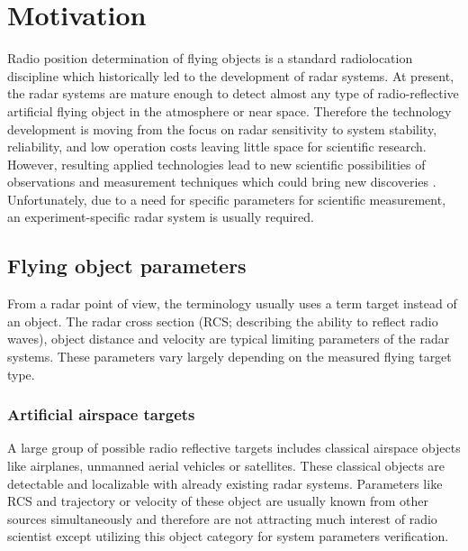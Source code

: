 \documentclass[twoside]{ctuthesis}
\theoremstyle{plain}
\theoremstyle{definition}
\theoremstyle{note}
\begin{document}
\maketitle

\chapter{Motivation}

Radio position determination of flying objects is a standard radiolocation discipline which historically led to the development of radar systems. At present, the radar systems are mature enough to detect almost any type of radio-reflective artificial flying object in the atmosphere or near space. \cite{Radar_basics} Therefore the technology development is moving from the focus on radar sensitivity to system stability, reliability, and low operation costs leaving little space for scientific research. However, resulting applied technologies lead to new scientific possibilities of observations and measurement techniques which could bring new discoveries \cite{LOFAR}. Unfortunately, due to a need for specific parameters for scientific measurement, an experiment-specific radar system is usually required. 

\section{Flying object parameters}

From a radar point of view, the terminology usually uses a term target instead of an object. The radar cross section (RCS; describing the ability to reflect radio waves), object distance and velocity are typical limiting parameters of the radar systems. These parameters vary largely depending on the measured flying target type. 

\subsection{Artificial airspace targets}

A large group of possible radio reflective targets includes classical airspace objects like airplanes, unmanned aerial vehicles or satellites. These classical objects are detectable and localizable with already existing radar systems. Parameters like RCS and trajectory or velocity of these object are usually known from other sources simultaneously and therefore are not attracting much interest of radio scientist except utilizing this object category for system parameters verification. 
\end{document}
